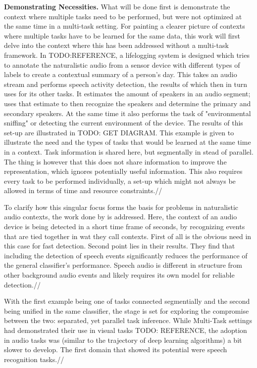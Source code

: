 \textbf{Demonstrating Necessities.} What will be done first is demonstrate the context where multiple tasks need to be performed, but were not optimized at the same time in a multi-task setting. For painting a clearer picture of contexts where multiple tasks have to be learned for the same data, this work will first delve into the context where this has been addressed without a multi-task framework. In TODO:REFERENCE, a lifelogging system is designed which tries to annotate the naturalistic audio from a sensor device with different types of labels to create a contextual summary of a person's day. This takes an audio stream and performs speech activity detection, the results of which then in turn uses for its other tasks. It estimates the amount of speakers in an audio segment; uses that estimate to then recognize the speakers and determine the primary and secondary speakers. At the same time it also performs the task of "environmental sniffing" or detecting the current environment of the device. The results of this set-up are illustrated in TODO: GET DIAGRAM. This example is given to illustrate the need and the types of tasks that would be learned at the same time in a context. Task information is shared here, but segmentally in stead of parallel. The thing is however that this does not share information to improve the representation, which ignores potentially useful information. This also requires every task to be performed individually, a set-up which might not always be allowed in terms of time and resource constraints.//

To clarify how this singular focus forms the basis for problems in naturalistic audio contexts, the work done by \cite{park2020augmenting} is addressed. Here, the context of an audio device is being detected in a short time frame of seconds, by recognizing events that are tied together in wat they call contexts. First of all is the obvious need in this case for fast detection. Second point lies in their results. They find that including the detection of speech events significantly reduces the performance of the general classifier's performance. Speech audio is different in structure from other background audio events and likely requires its own model for reliable detection.//

With the first example being one of tasks connected segmentially and the second being unified in the same classifier, the stage is set for exploring the compromise between the two: separated, yet parallel task inference. While Multi-Task settings had demonstrated their use in visual tasks TODO: REFERENCE, the adoption in audio tasks was (similar to the trajectory of deep learning algorithms) a bit slower to develop. The first domain that showed its potential were speech recognition tasks.//

